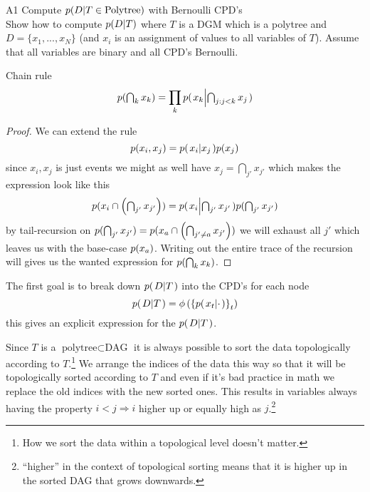 \documentclass[a4paper,twoside=false,abstract=false,numbers=noenddot,
titlepage=false,headings=small,parskip=half,version=last]{scrartcl}
\begin{document}

\begin{exercise}{A1} Compute $p{(D|T\in{\text{Polytree}})}$ with Bernoulli
    CPD's \\
    Show how to compute $p{(D|T)}$ where $T$ is a DGM which is a polytree and
    $D = \{x_1,...,x_N\}$ (and $x_i$ is an assignment of values to all
    variables of $T$).
    Assume that all variables are binary and all CPD's Bernoulli.
\end{exercise}
\begin{solution}
    \begin{theorem} Chain rule
    \begin{equation}
        p{(\textstyle\bigcap_k
        x_k)}=\prod_kp{(\left. x_k \middle\vert \textstyle\bigcap_{j:j<k}x_j \right.)}
    \end{equation}
    \end{theorem}
    \begin{proof}
        We can extend the rule 
        \begin{equation}
            p{(x_i,x_j)} = p{(\left. x_i \middle\vert x_j \right.)}p{(x_j)} 
        \end{equation}
        since $x_i,x_j$ is just events we might as well have 
        $x_j=\bigcap_{j'}x_{j'}$ which makes the expression look like this
        \begin{equation}
            p{(x_i\cap \left(\textstyle\bigcap_{j'}x_{j'}\right))} =
           p{(\left. x_i \middle\vert \textstyle\bigcap_{j'}x_{j'} \right.)}
           p{(\textstyle\bigcap_{j'}x_{j'})}
        \end{equation}
        by tail-recursion on
        $p{(\bigcap_{j'}x_{j'})}=p{(x_a\cap\left(\bigcap_{j'\neq
        a}x_{j'}\right))}$ we will exhaust all $j'$ which leaves us with the
        base-case $p{(x_a)}$. Writing out the entire trace of the recursion
        will gives us the wanted expression for $p{(\bigcap_k x_k)}$.
    \end{proof}
    The first goal is to break down $p{(\left. D \middle\vert T \right.)}$ into the CPD's for each node
    \begin{equation}
        p{(\left. D \middle\vert T \right.)} = \phi
                            \left(
                                \left\{
                                    p{(\left. x_t \middle\vert \cdot \right.)}
                                \right\}_t
                            \right)
    \end{equation}
    this gives an explicit expression for the $p{(\left. D \middle\vert T \right.)}$.

    Since $T$ is a $\text{polytree}\subset\text{DAG}$ it is always possible to 
    sort the data topologically according to $T$.\footnote{How we sort the data
    within a topological level doesn't matter.} 
    We arrange the indices of the data this way so that it will be
    topologically sorted according to $T$ and even if it's bad practice in math we
    replace the old indices with the new sorted ones. This results in
    variables always having the property $i<j\Rightarrow i$ higher up or equally high
    as $j$.\footnote{``higher'' in the context of topological sorting means
    that it is higher up in the sorted DAG that grows downwards.}


\end{solution}
\end{document}
